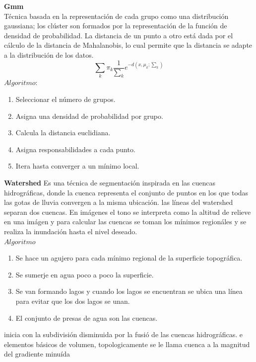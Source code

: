 \documentclass[10pt,twocolumn,letterpaper]{article}
\begin{document}
\textbf{Gmm}
\\
Técnica basada en la representación de cada grupo como una distribución gaussiana; los clúster son formados por la representación de la función de densidad de probabilidad.
La distancia de un punto a otro está dada por el cálculo de la distancia de Mahalanobis, lo cual permite que la distancia se adapte a la distribución de los datos. 
\newline
\\
\begin{equation}
 \sum_{k} \pi_{k}\frac{1}{\sum_k} e^{-d(x,\mu_k;\sum_k)}
\end{equation}
$Algoritmo:$
\begin{enumerate}
\item Seleccionar el número de grupos.
\item Asigna una densidad de probabilidad por grupo.
\item Calcula la distancia euclidiana.
\item Asigna responsabilidades a cada punto.
\item Itera hasta converger a un mínimo local.
\end {enumerate}

\textbf{Watershed}
\newline
Es una técnica de segmentación inspirada en las cuencas hidrográficas, donde la cuenca representa
el conjunto de puntos en los que todas las gotas de lluvia convergen a la misma ubicación. 
las líneas del watershed separan dos cuencas.
En imágenes el tono se interpreta como la altitud de relieve en una imágen y para calcular las cuencas 
se toman los mínimos regionáles y se realiza la inundación hasta el nivel deseado.
\newline
\\
$Algoritmo$

\begin{enumerate}
 \item Se hace un agujero para cada mínimo regional de la superficie topográfica.
 \item Se sumerje en agua poco a poco la superficie.
 \item Se van formando lagos y cuando los lagos se encuentran se ubica una línea para evitar que los dos lagos se unan.
 \item El conjunto de presas de agua son las cuencas. 
 \end{enumerate}

inicia con la subdivisión disminuida por la fusió de las 
cuencas hidrográficas. e elementos básicos de volumen,
topologicamente se le llama cuenca a la magnitud del gradiente minuída   
\end{document}
